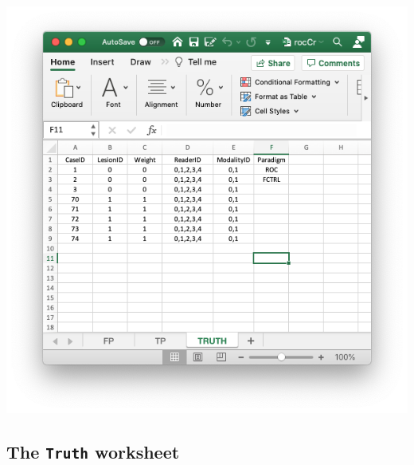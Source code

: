 \documentclass[
]{book}
\begin{document}
\includegraphics[width=1\textwidth,height=\textheight]{images/quick-start/rocCrTruth.png}

\hypertarget{quick-start-roc-truth}{%
\subsection{\texorpdfstring{The \texttt{Truth} worksheet}{The Truth worksheet}}\label{quick-start-roc-truth}}
\end{document}
